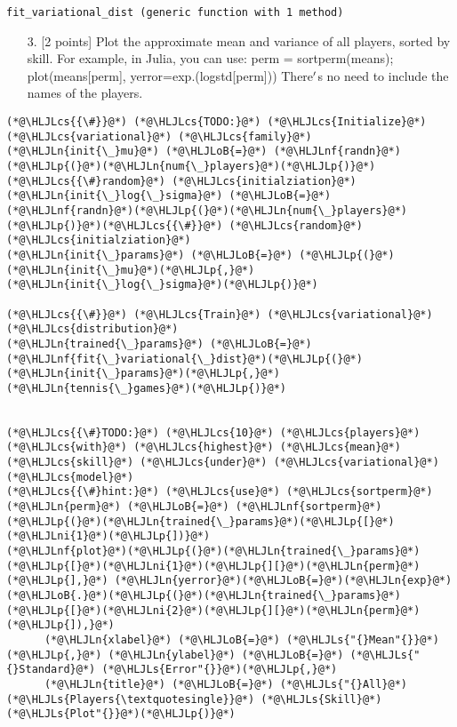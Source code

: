 \documentclass[12pt,a4paper]{article}
\newcommand{\HLJLn}[1]{#1}
\newcommand{\HLJLnf}[1]{\textcolor[RGB]{66,102,213}{#1}}
\newcommand{\HLJLs}[1]{\textcolor[RGB]{201,61,57}{#1}}
\newcommand{\HLJLni}[1]{\textcolor[RGB]{59,151,46}{#1}}
\newcommand{\HLJLoB}[1]{\textcolor[RGB]{102,102,102}{\textbf{#1}}}
\newcommand{\HLJLp}[1]{#1}
\newcommand{\HLJLcs}[1]{\textcolor[RGB]{153,153,119}{\textit{#1}}}
\begin{document}
\begin{lstlisting}
fit_variational_dist (generic function with 1 method)
\end{lstlisting}


\begin{itemize}
\item[3. ] [2 points] Plot the approximate mean and variance of all players, sorted by skill. For example, in Julia, you can use: perm = sortperm(means); plot(means[perm], yerror=exp.(logstd[perm])) There\ensuremath{\rq}s no need to include the names of the players.

\end{itemize}

\begin{lstlisting}
(*@\HLJLcs{{\#}}@*) (*@\HLJLcs{TODO:}@*) (*@\HLJLcs{Initialize}@*) (*@\HLJLcs{variational}@*) (*@\HLJLcs{family}@*)
(*@\HLJLn{init{\_}mu}@*) (*@\HLJLoB{=}@*) (*@\HLJLnf{randn}@*)(*@\HLJLp{(}@*)(*@\HLJLn{num{\_}players}@*)(*@\HLJLp{)}@*)(*@\HLJLcs{{\#}random}@*) (*@\HLJLcs{initialziation}@*)
(*@\HLJLn{init{\_}log{\_}sigma}@*) (*@\HLJLoB{=}@*) (*@\HLJLnf{randn}@*)(*@\HLJLp{(}@*)(*@\HLJLn{num{\_}players}@*)(*@\HLJLp{)}@*)(*@\HLJLcs{{\#}}@*) (*@\HLJLcs{random}@*) (*@\HLJLcs{initialziation}@*)
(*@\HLJLn{init{\_}params}@*) (*@\HLJLoB{=}@*) (*@\HLJLp{(}@*)(*@\HLJLn{init{\_}mu}@*)(*@\HLJLp{,}@*) (*@\HLJLn{init{\_}log{\_}sigma}@*)(*@\HLJLp{)}@*)

(*@\HLJLcs{{\#}}@*) (*@\HLJLcs{Train}@*) (*@\HLJLcs{variational}@*) (*@\HLJLcs{distribution}@*)
(*@\HLJLn{trained{\_}params}@*) (*@\HLJLoB{=}@*) (*@\HLJLnf{fit{\_}variational{\_}dist}@*)(*@\HLJLp{(}@*)(*@\HLJLn{init{\_}params}@*)(*@\HLJLp{,}@*) (*@\HLJLn{tennis{\_}games}@*)(*@\HLJLp{)}@*)


(*@\HLJLcs{{\#}TODO:}@*) (*@\HLJLcs{10}@*) (*@\HLJLcs{players}@*) (*@\HLJLcs{with}@*) (*@\HLJLcs{highest}@*) (*@\HLJLcs{mean}@*) (*@\HLJLcs{skill}@*) (*@\HLJLcs{under}@*) (*@\HLJLcs{variational}@*) (*@\HLJLcs{model}@*)
(*@\HLJLcs{{\#}hint:}@*) (*@\HLJLcs{use}@*) (*@\HLJLcs{sortperm}@*)
(*@\HLJLn{perm}@*) (*@\HLJLoB{=}@*) (*@\HLJLnf{sortperm}@*)(*@\HLJLp{(}@*)(*@\HLJLn{trained{\_}params}@*)(*@\HLJLp{[}@*)(*@\HLJLni{1}@*)(*@\HLJLp{])}@*)
(*@\HLJLnf{plot}@*)(*@\HLJLp{(}@*)(*@\HLJLn{trained{\_}params}@*)(*@\HLJLp{[}@*)(*@\HLJLni{1}@*)(*@\HLJLp{][}@*)(*@\HLJLn{perm}@*)(*@\HLJLp{],}@*) (*@\HLJLn{yerror}@*)(*@\HLJLoB{=}@*)(*@\HLJLn{exp}@*)(*@\HLJLoB{.}@*)(*@\HLJLp{(}@*)(*@\HLJLn{trained{\_}params}@*)(*@\HLJLp{[}@*)(*@\HLJLni{2}@*)(*@\HLJLp{][}@*)(*@\HLJLn{perm}@*)(*@\HLJLp{]),}@*)
      (*@\HLJLn{xlabel}@*) (*@\HLJLoB{=}@*) (*@\HLJLs{"{}Mean"{}}@*)(*@\HLJLp{,}@*) (*@\HLJLn{ylabel}@*) (*@\HLJLoB{=}@*) (*@\HLJLs{"{}Standard}@*) (*@\HLJLs{Error"{}}@*)(*@\HLJLp{,}@*)
      (*@\HLJLn{title}@*) (*@\HLJLoB{=}@*) (*@\HLJLs{"{}All}@*) (*@\HLJLs{Players{\textquotesingle}}@*) (*@\HLJLs{Skill}@*) (*@\HLJLs{Plot"{}}@*)(*@\HLJLp{)}@*)
\end{lstlisting}
\end{document}
